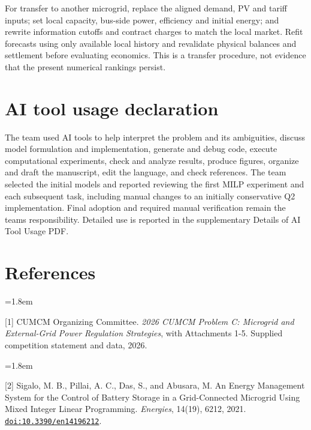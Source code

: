 For transfer to another microgrid, replace the aligned demand, PV and tariff inputs; set local capacity, bus-side power, efficiency and initial energy; and rewrite information cutoffs and contract charges to match the local market. Refit forecasts using only available local history and revalidate physical balances and settlement before evaluating economics. This is a transfer procedure, not evidence that the present numerical rankings persist.

\section*{AI tool usage declaration}\label{ai-tool-usage-declaration}

The team used AI tools to help interpret the problem and its ambiguities, discuss model formulation and implementation, generate and debug code, execute computational experiments, check and analyze results, produce figures, organize and draft the manuscript, edit the language, and check references. The team selected the initial models and reported reviewing the first MILP experiment and each subsequent task, including manual changes to an initially conservative Q2 implementation. Final adoption and required manual verification remain the team\textquotesingle s responsibility. Detailed use is reported in the supplementary Details of AI Tool Usage PDF.

\clearpage

\section*{References}\label{references}

\begingroup
\bibfont
\raggedright
\setlength{\parindent}{0pt}

\hangindent=1.8em

{[}1{]} CUMCM Organizing Committee. \emph{2026 CUMCM Problem C: Microgrid and External-Grid Power Regulation Strategies}, with Attachments 1-5. Supplied competition statement and data, 2026.

\hangindent=1.8em

{[}2{]} Sigalo, M. B., Pillai, A. C., Das, S., and Abusara, M. An Energy Management System for the Control of Battery Storage in a Grid-Connected Microgrid Using Mixed Integer Linear Programming. \emph{Energies}, 14(19), 6212, 2021. \href{https://doi.org/10.3390/en14196212}{\nolinkurl{doi:10.3390/en14196212}}.

